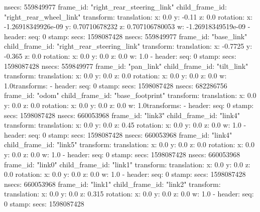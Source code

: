        nsecs: 559849977
      frame_id: "right_rear_steering_link"
    child_frame_id: "right_rear_wheel_link"
    transform: 
      translation: 
        x: 0.0
        y: -0.11
        z: 0.0
      rotation: 
        x: -1.26918349926e-09
        y: 0.70710678232
        z: 0.707106780053
        w: -1.26918349519e-09
  - 
    header: 
      seq: 0
      stamp: 
        secs: 1598087428
        nsecs: 559849977
      frame_id: "base_link"
    child_frame_id: "right_rear_steering_link"
    transform: 
      translation: 
        x: -0.7725
        y: -0.365
        z: 0.0
      rotation: 
        x: 0.0
        y: 0.0
        z: 0.0
        w: 1.0
  - 
    header: 
      seq: 0
      stamp: 
        secs: 1598087428
        nsecs: 559849977
      frame_id: "pan_link"
    child_frame_id: "tilt_link"
    transform: 
      translation: 
        x: 0.0
        y: 0.0
        z: 0.0
      rotation: 
        x: 0.0
        y: 0.0
        z: 0.0
        w: 1.0transforms: 
  - 
    header: 
      seq: 0
      stamp: 
        secs: 1598087428
        nsecs: 682286756
      frame_id: "odom"
    child_frame_id: "base_footprint"
    transform: 
      translation: 
        x: 0.0
        y: 0.0
        z: 0.0
      rotation: 
        x: 0.0
        y: 0.0
        z: 0.0
        w: 1.0transforms: 
  - 
    header: 
      seq: 0
      stamp: 
        secs: 1598087428
        nsecs: 660053968
      frame_id: "link3"
    child_frame_id: "link4"
    transform: 
      translation: 
        x: 0.0
        y: 0.0
        z: 0.45
      rotation: 
        x: 0.0
        y: 0.0
        z: 0.0
        w: 1.0
  - 
    header: 
      seq: 0
      stamp: 
        secs: 1598087428
        nsecs: 660053968
      frame_id: "link4"
    child_frame_id: "link5"
    transform: 
      translation: 
        x: 0.0
        y: 0.0
        z: 0.0
      rotation: 
        x: 0.0
        y: 0.0
        z: 0.0
        w: 1.0
  - 
    header: 
      seq: 0
      stamp: 
        secs: 1598087428
        nsecs: 660053968
      frame_id: "link0"
    child_frame_id: "link1"
    transform: 
      translation: 
        x: 0.0
        y: 0.0
        z: 0.0
      rotation: 
        x: 0.0
        y: 0.0
        z: 0.0
        w: 1.0
  - 
    header: 
      seq: 0
      stamp: 
        secs: 1598087428
        nsecs: 660053968
      frame_id: "link1"
    child_frame_id: "link2"
    transform: 
      translation: 
        x: 0.0
        y: 0.0
        z: 0.315
      rotation: 
        x: 0.0
        y: 0.0
        z: 0.0
        w: 1.0
  - 
    header: 
      seq: 0
      stamp: 
        secs: 1598087428
